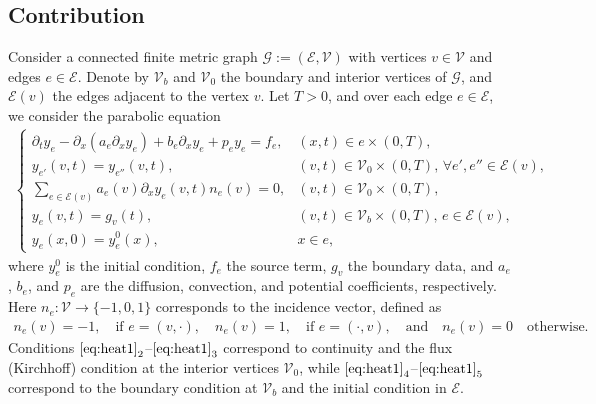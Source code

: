 \documentclass[a4paper, 10pt, english]{article}
\def\to{\rightarrow}
\begin{document}
\subsection{Contribution} 
Consider a connected finite metric graph $\mathcal{G} := (\mathcal{E}, \mathcal{V})$ with vertices $v \in \mathcal{V}$ and edges $e \in \mathcal{E}$. Denote by $\mathcal{V}_b$ and $\mathcal{V}_0$ the boundary and interior vertices of $\mathcal{G}$, and $\mathcal{E}(v)$ the edges adjacent to the vertex $v$. Let $T > 0$, and over each edge $e \in \mathcal{E}$, we consider the parabolic equation
\begin{align}\label{eq:heat1}
\begin{cases}
\partial_t y_e - \partial_{x}(a_e\partial_x y_e)+ b_e\partial_x y_e +p_e y_e = f_e, & (x,t) \in e \times (0, T), \\
y_{e'}(v, t) = y_{e''}(v, t), & (v,t) \in \mathcal{V}_0\times(0,T),\,\forall e', e'' \in \mathcal{E}(v), \\
\sum_{e \in \mathcal{E}(v)}a_e(v) \partial_x y_e(v, t) n_e(v) = 0, & 
(v,t) \in \mathcal{V}_0\times(0,T),\\
y_e(v, t) = g_v(t), & (v,t) \in \mathcal{V}_b\times(0,T),\, e \in \mathcal{E}(v), \\
y_e(x, 0)= y_e^0(x), & x \in e,
\end{cases}
\end{align}
where $y_e^0$ is the initial condition, $f_e$ the source term, $g_v$ the boundary data, and $a_e$, $b_e$, and $p_e$ are the diffusion, convection, and potential coefficients, respectively. Here $n_e: \mathcal{V} \to \{-1, 0, 1\}$ corresponds to the incidence vector, defined as
\begin{align*}
    n_e(v)=-1, \quad \text {if } e=(v, \cdot), \quad n_e(v)=1, \quad \text {if } e=(\cdot, v), \quad \text {and} \quad n_e(v)=0 \quad \text {otherwise. }
\end{align*}
Conditions $\eqref{eq:heat1}_2$–$\eqref{eq:heat1}_3$ correspond to continuity and the flux (Kirchhoff) condition at the interior vertices $\mathcal{V}_0$, while $\eqref{eq:heat1}_4$–$\eqref{eq:heat1}_5$ correspond to the boundary condition at $\mathcal{V}_b$ and the initial condition in $\mathcal{E}$.
\end{document}
